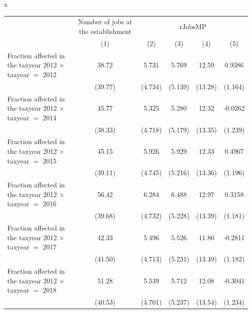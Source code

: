 x
\begingroup
\centering
\begin{tabular}{lccccc}
   \toprule
    & Number of jobs at the establishment & \multicolumn{4}{c}{rJobsMP}\\
                                                                    & (1)           & (2)           & (3)           & (4)           & (5)\\  
   \midrule 
   Fraction affected in the taxyear 2012 $\times$ taxyear $=$ 2012  & 38.72         & 5.731         & 5.769         & 12.59         & 0.9386\\   
                                                                    & (39.77)       & (4.734)       & (5.139)       & (13.28)       & (1.164)\\   
   Fraction affected in the taxyear 2012 $\times$ taxyear $=$ 2014  & 45.77         & 5.325         & 5.280         & 12.32         & -0.0262\\   
                                                                    & (38.33)       & (4.718)       & (5.179)       & (13.35)       & (1.239)\\   
   Fraction affected in the taxyear 2012 $\times$ taxyear $=$ 2015  & 45.15         & 5.926         & 5.929         & 12.33         & 0.4967\\   
                                                                    & (39.11)       & (4.745)       & (5.216)       & (13.36)       & (1.196)\\   
   Fraction affected in the taxyear 2012 $\times$ taxyear $=$ 2016  & 56.42         & 6.284         & 6.488         & 12.97         & 0.3158\\   
                                                                    & (39.68)       & (4.732)       & (5.228)       & (13.39)       & (1.181)\\   
   Fraction affected in the taxyear 2012 $\times$ taxyear $=$ 2017  & 42.33         & 5.496         & 5.526         & 11.86         & -0.2811\\   
                                                                    & (41.50)       & (4.713)       & (5.231)       & (13.49)       & (1.182)\\   
   Fraction affected in the taxyear 2012 $\times$ taxyear $=$ 2018  & 51.28         & 5.539         & 5.712         & 12.08         & -0.3041\\   
                                                                    & (40.53)       & (4.701)       & (5.237)       & (13.54)       & (1.234)\\   

\end{tabular}
